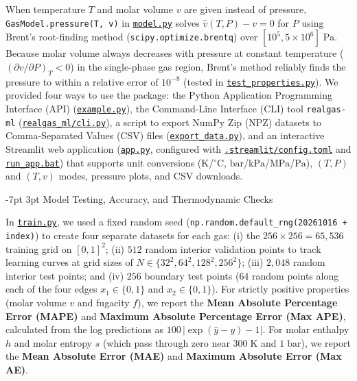 \documentclass[10pt,a4paper]{article}
\makeatletter
\renewcommand\section{\@startsection {section}{1}{\z@}%
  {-7pt \@plus -2pt \@minus -1pt}%
  {3pt \@plus 1pt}%
  {\normalfont\large\bfseries\color{darkslate}}}
\makeatother
\begin{document}
When temperature $T$ and molar volume $v$ are given instead of pressure, \texttt{GasModel.pressure(T, v)} in \href{https://github.com/satwikgupta122/realgas_ml/blob/main/realgas_ml/model.py}{\texttt{model.py}} solves $\hat{v}(T, P) - v = 0$ for $P$ using Brent's root-finding method (\texttt{scipy.optimize.brentq}) over $[10^5, 5\times 10^6]\;\mathrm{Pa}$. Because molar volume always decreases with pressure at constant temperature ($(\partial v/\partial P)_T < 0$) in the single-phase gas region, Brent's method reliably finds the pressure to within a relative error of $10^{-8}$ (tested in \href{https://github.com/satwikgupta122/realgas_ml/blob/main/tests/test_properties.py}{\texttt{test\_properties.py}}). We provided four ways to use the package: the Python Application Programming Interface (API) (\href{https://github.com/satwikgupta122/realgas_ml/blob/main/example.py}{\texttt{example.py}}), the Command-Line Interface (CLI) tool \texttt{realgas-ml} (\href{https://github.com/satwikgupta122/realgas_ml/blob/main/realgas_ml/cli.py}{\texttt{realgas\_ml/cli.py}}), a script to export NumPy Zip (NPZ) datasets to Comma-Separated Values (CSV) files (\href{https://github.com/satwikgupta122/realgas_ml/blob/main/export_data.py}{\texttt{export\_data.py}}), and an interactive Streamlit web application (\href{https://github.com/satwikgupta122/realgas_ml/blob/main/app.py}{\texttt{app.py}}, configured with \href{https://github.com/satwikgupta122/realgas_ml/blob/main/.streamlit/config.toml}{\texttt{.streamlit/config.toml}} and \href{https://github.com/satwikgupta122/realgas_ml/blob/main/run_app.bat}{\texttt{run\_app.bat}}) that supports unit conversions ($\mathrm{K}$/$^\circ\mathrm{C}$, $\mathrm{bar}$/$\mathrm{kPa}$/$\mathrm{MPa}$/$\mathrm{Pa}$), $(T,P)$ and $(T,v)$ modes, pressure plots, and CSV downloads.

\section{Model Testing, Accuracy, and Thermodynamic Checks}

In \href{https://github.com/satwikgupta122/realgas_ml/blob/main/train.py}{\texttt{train.py}}, we used a fixed random seed (\texttt{np.random.default\_rng(20261016 + index)}) to create four separate datasets for each gas: (i) the $256 \times 256 = 65{,}536$ training grid on $[0, 1]^2$; (ii) $512$ random interior validation points to track learning curves at grid sizes of $N \in \{32^2, 64^2, 128^2, 256^2\}$; (iii) $2{,}048$ random interior test points; and (iv) $256$ boundary test points ($64$ random points along each of the four edges $x_1 \in \{0,1\}$ and $x_2 \in \{0,1\}$). For strictly positive properties (molar volume $v$ and fugacity $f$), we report the \textbf{Mean Absolute Percentage Error (MAPE)} and \textbf{Maximum Absolute Percentage Error (Max APE)}, calculated from the log predictions as $100\,|\exp(\hat{y} - y) - 1|$. For molar enthalpy $h$ and molar entropy $s$ (which pass through zero near $300\;\mathrm{K}$ and $1\;\mathrm{bar}$), we report the \textbf{Mean Absolute Error (MAE)} and \textbf{Maximum Absolute Error (Max AE)}.
\end{document}
